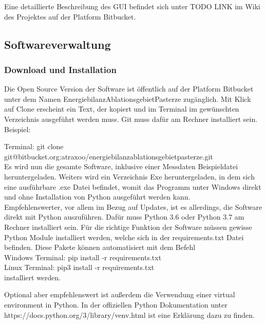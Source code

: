 \documentclass[12pt,a4paper]{article}
\begin{document}
Eine detaillierte Beschreibung des GUI befindet sich unter TODO LINK im Wiki des Projektes auf der Platform Bitbucket.


\subsection{Softwareverwaltung}
\subsubsection{Download und Installation}
Die Open Source Version der Software ist öffentlich auf der  Platform Bitbucket unter dem Namen EnergiebilanzAblationsgebietPasterze zugänglich. Mit Klick auf Clone erscheint ein Text, der kopiert und im Terminal im gewünschten Verzeichnis ausgeführt werden muss. Git muss dafür am Rechner installiert sein.\\

Beispiel:

Terminal: \textsf{\small git clone git@bitbucket.org:atraxoo/energiebilanzablationsgebietpasterze.git}\\


Es wird nun die gesamte Software, inklusive einer Messdaten Beispieldatei heruntergeladen. Weiters wird ein Verzeichnis Exe heruntergeladen, in dem sich eine ausführbare .exe Datei befindet, womit das Programm unter Windows direkt und ohne Installation von Python ausgeführt werden kann.\\

Empfehlenswerter, vor allem im Bezug auf Updates, ist es allerdings, die Software direkt mit Python auszuführen. Dafür muss Python 3.6 oder Python 3.7 am Rechner installiert sein. Für die richtige Funktion der Software müssen gewisse Python Module installiert werden, welche sich in der requirements.txt Datei befinden. Diese Pakete können automatisiert mit dem Befehl\\

Windows Terminal: \textsf{\small pip install -r requirements.txt}\\
Linux Terminal:  \textsf{\small pip3 install -r requirements.txt}\\

installiert werden.

Optional aber empfehlenswert ist außerdem die Verwendung einer virtual environment in Python. In der offiziellen Python Dokumentation unter \textsf{\small https://docs.python.org/3/library/venv.html} ist eine Erklärung dazu zu finden.
\end{document}
